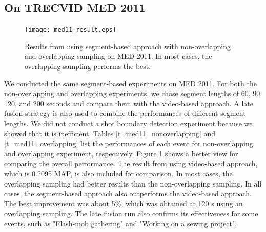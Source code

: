 \subsection{On TRECVID MED 2011}

\begin{figure}
	\centering
	\texttt{[image: med11\_result.eps]}
	\caption{Results from using segment-based approach with non-overlapping and overlapping sampling on MED 2011. In most cases, the overlapping sampling performs the best.}
	\label{f_med11_result}
\end{figure}

We conducted the same segment-based experiments on MED 2011. For both the non-overlapping and overlapping experiments, we chose segment lengths of 60, 90, 120, and 200 seconds and compare them with the video-based approach. A late fusion strategy is also used to combine the performances of different segment lengths. We did not conduct a shot boundary detection experiment because we showed that it is inefficient. Tables \ref{t_med11_nonoverlapping} and \ref{t_med11_overlapping} list the performances of each event for non-overlapping and overlapping experiment, respectively. Figure \ref{f_med11_result} shows a better view for comparing the overall performance. The result from using video-based approach, which is 0.2095 MAP, is also included for comparison. In most cases, the overlapping sampling had better results than the non-overlapping sampling. In all cases, the segment-based approach also outperforms the video-based approach. The best improvement was about 5\%, which was obtained at 120 s using an overlapping sampling. The late fusion run also confirms its effectiveness for some events, such as "Flash-mob gathering" and "Working on a sewing project".

